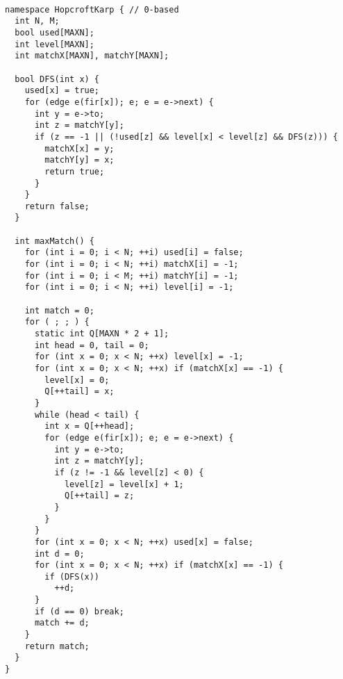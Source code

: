 \begin{lstlisting}

namespace HopcroftKarp { // 0-based
  int N, M;
  bool used[MAXN];
  int level[MAXN];
  int matchX[MAXN], matchY[MAXN];

  bool DFS(int x) {
    used[x] = true;
    for (edge e(fir[x]); e; e = e->next) {
      int y = e->to;
      int z = matchY[y];
      if (z == -1 || (!used[z] && level[x] < level[z] && DFS(z))) {
        matchX[x] = y;
        matchY[y] = x;
        return true;
      }
    }
    return false;
  }

  int maxMatch() {
    for (int i = 0; i < N; ++i) used[i] = false;
    for (int i = 0; i < N; ++i) matchX[i] = -1;
    for (int i = 0; i < M; ++i) matchY[i] = -1;
    for (int i = 0; i < N; ++i) level[i] = -1;

    int match = 0;
    for ( ; ; ) {
      static int Q[MAXN * 2 + 1];
      int head = 0, tail = 0;
      for (int x = 0; x < N; ++x) level[x] = -1;
      for (int x = 0; x < N; ++x) if (matchX[x] == -1) {
        level[x] = 0;
        Q[++tail] = x;
      }
      while (head < tail) {
        int x = Q[++head];
        for (edge e(fir[x]); e; e = e->next) {
          int y = e->to;
          int z = matchY[y];
          if (z != -1 && level[z] < 0) {
            level[z] = level[x] + 1;
            Q[++tail] = z;
          }
        }
      }
      for (int x = 0; x < N; ++x) used[x] = false;
      int d = 0;
      for (int x = 0; x < N; ++x) if (matchX[x] == -1) {
        if (DFS(x))
          ++d;
      }
      if (d == 0) break;
      match += d;
    }
    return match;
  }
}



\end{lstlisting}